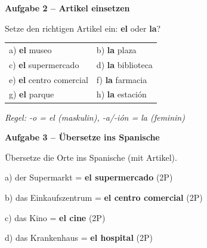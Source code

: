 \documentclass[11pt, a4paper]{article}
\newcommand{\fachfarbe}{spanisch}
\newcommand{\punktebox}[1]{\hfill\fbox{\small \_\_\_/#1}}
\newcommand{\lsg}[1]{\textcolor{loesung}{\textbf{#1}}}
\newenvironment{aufgabe}[1]{%
    \needspace{5\baselineskip}%
    \nopagebreak[4]%
    \vspace{10pt}
    \noindent\textbf{\textcolor{\fachfarbe}{Aufgabe #1}}
    \nopagebreak[4]%
    \vspace{5pt}
    \nopagebreak[4]%
    \begin{list}{}{\leftmargin=0pt}
    \item[]
}{%
    \end{list}
}
\newcommand{\es}[1]{\textcolor{\fachfarbe}{\textbf{#1}}}
\begin{document}
\vspace{15pt}


\begin{aufgabe}{2 -- Artikel einsetzen}
Setze den richtigen Artikel ein: \es{el} oder \es{la}? \punktebox{8}
\end{aufgabe}

\noindent
\begin{tabular}{p{}p{}}
a) \lsg{el} museo & b) \lsg{la} plaza \\[0.8em]
c) \lsg{el} supermercado & d) \lsg{la} biblioteca \\[0.8em]
e) \lsg{el} centro comercial & f) \lsg{la} farmacia \\[0.8em]
g) \lsg{el} parque & h) \lsg{la} estación \\
\end{tabular}

\vspace{0.5em}
\textcolor{loesung}{\textit{Regel: -o = el (maskulin), -a/-ión = la (feminin)}}

\vspace{15pt}


\begin{aufgabe}{3 -- Übersetze ins Spanische}
Übersetze die Orte ins Spanische (mit Artikel). \punktebox{10}
\end{aufgabe}

\noindent
a) der Supermarkt = \lsg{el supermercado} \hfill (2P)

\vspace{0.8em}

\noindent
b) das Einkaufszentrum = \lsg{el centro comercial} \hfill (2P)

\vspace{0.8em}

\noindent
c) das Kino = \lsg{el cine} \hfill (2P)

\vspace{0.8em}

\noindent
d) das Krankenhaus = \lsg{el hospital} \hfill (2P)

\vspace{0.8em}
\end{document}
